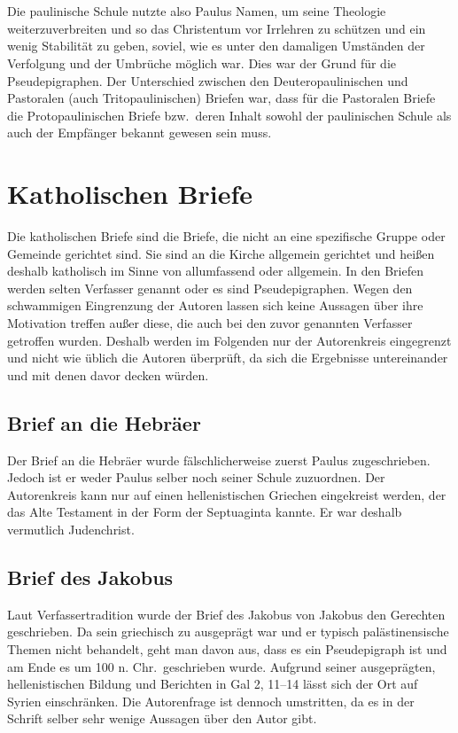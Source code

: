\\~\\
Die paulinische Schule nutzte also Paulus Namen, um seine Theologie weiterzuverbreiten und so das Christentum vor Irrlehren zu schützen und ein wenig Stabilität zu geben, soviel, wie es unter den damaligen Umständen der Verfolgung und der Umbrüche möglich war. Dies war der Grund für die Pseudepigraphen. Der Unterschied zwischen den Deuteropaulinischen und Pastoralen (auch Tritopaulinischen) Briefen war, dass für die Pastoralen Briefe die Protopaulinischen Briefe bzw.\ deren Inhalt sowohl der paulinischen Schule als auch der Empfänger bekannt gewesen sein muss.

\section{Katholischen Briefe}
Die katholischen Briefe sind die Briefe, die nicht an eine spezifische Gruppe oder Gemeinde gerichtet sind. Sie sind an die Kirche allgemein gerichtet und heißen deshalb katholisch im Sinne von allumfassend oder allgemein. In den Briefen werden selten Verfasser genannt oder es sind Pseudepigraphen. Wegen den schwammigen Eingrenzung der Autoren lassen sich keine Aussagen über ihre Motivation treffen außer diese, die auch bei den zuvor genannten Verfasser getroffen wurden. Deshalb werden im Folgenden nur der Autorenkreis eingegrenzt und nicht wie üblich die Autoren überprüft, da sich die Ergebnisse untereinander und mit denen davor decken würden.

\subsection*{Brief an die Hebräer}
Der Brief an die Hebräer wurde fälschlicherweise zuerst Paulus zugeschrieben. Jedoch ist er weder Paulus selber noch seiner Schule zuzuordnen. Der Autorenkreis kann nur auf einen hellenistischen Griechen eingekreist werden, der das Alte Testament in der Form der Septuaginta kannte. Er war deshalb vermutlich Judenchrist.

\subsection*{Brief des Jakobus}
Laut Verfassertradition wurde der Brief des Jakobus von Jakobus den Gerechten geschrieben. Da sein griechisch zu ausgeprägt war und er typisch palästinensische Themen nicht behandelt, geht man davon aus, dass es ein Pseudepigraph ist und am Ende es um 100 n. Chr.\ geschrieben wurde. Aufgrund seiner ausgeprägten, hellenistischen Bildung und Berichten in  Gal 2, 11--14 lässt sich der Ort auf Syrien einschränken. Die Autorenfrage ist dennoch umstritten, da es in der Schrift selber sehr wenige Aussagen über den Autor gibt.

